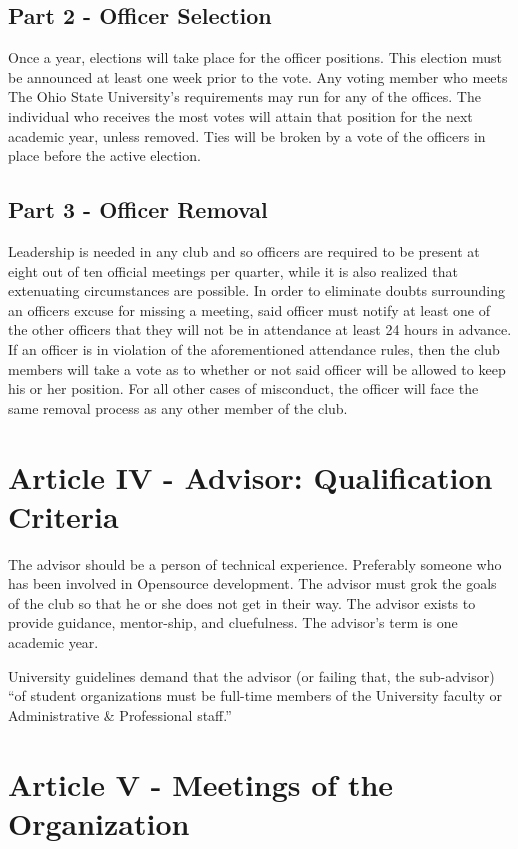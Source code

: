 \documentclass{article}
\begin{document}
	\subsection{Part 2 - Officer Selection}

	Once a year, elections will take place for the officer positions.  This election must be announced at least one week prior to the vote.  Any voting member who meets The Ohio State University's requirements may run for any of the offices.  The individual who receives the most votes will attain that position for the next academic year, unless removed.  Ties will be broken by a vote of the officers in place before the active election.

	\subsection{Part 3 - Officer Removal}

	Leadership is needed in any club and so officers are required to be
present at eight out of ten official meetings per quarter, while it is also
realized that extenuating circumstances are possible.  In order to eliminate
doubts surrounding an officers excuse for missing a meeting, said officer
must notify at least one of the other officers that they will not be in
attendance at least 24 hours in advance.  If an officer is in violation of
the aforementioned attendance rules, then the club members will take a vote
as to whether or not said officer will be allowed to keep his or her
position. For all other cases of misconduct, the officer will face the same
removal process as any other member of the club.

	\section{Article IV - Advisor: Qualification Criteria}

	The advisor should be a person of technical experience. Preferably someone who has been involved in Opensource development. The advisor must grok the goals of the club so that he or she does not get in their way. The advisor exists to provide guidance, mentor-ship, and cluefulness. The advisor's term is one academic year.

	University guidelines demand that the advisor (or failing that, the sub-advisor) ``of student organizations must be full-time members of the University faculty or Administrative \& Professional staff.''

	\section{Article V - Meetings of the Organization}
\end{document}
